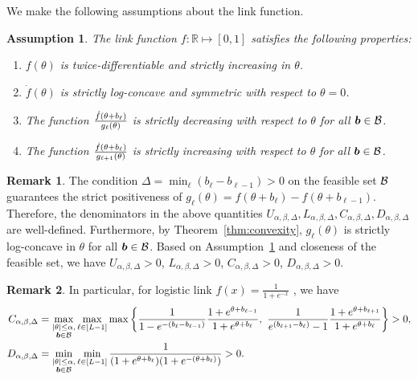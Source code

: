 \documentclass[11pt]{article}
\theoremstyle{plain}
\newtheorem{assumption}{Assumption}
\theoremstyle{definition}
\newtheorem{rmk}{Remark}
\begin{document}
We make the following assumptions about the link function.  
\begin{assumption}\label{ass:joint}
The link function $f\colon \mathbb{R}\mapsto [0,1]$ satisfies the following properties:
\begin{enumerate}
\item $f(\theta)$ is twice-differentiable and strictly increasing in $\theta$.
\item $\dot{f}(\theta)$ is strictly log-concave and symmetric with respect to $\theta=0$. 
\item The function ${\dot{f}(\theta+b_\ell)\over g_\ell(\theta)}$ is strictly decreasing with respect to $\theta$ for all $\bm{b}\in\mathcal{B}$. 
\item The function ${\dot{f}(\theta+b_\ell)\over g_{\ell+1}(\theta)}$ is strictly increasing with respect to $\theta$ for all $\bm{b}\in\mathcal{B}$. 
\end{enumerate}
\end{assumption}

\begin{rmk}
The condition $\Delta=\min_{\ell}(b_{\ell}-b_{\ell-1})>0$ on the feasible set $\mathcal{B}$ guarantees the strict positiveness of $g_{\ell}(\theta)=f(\theta+b_{\ell})-f(\theta+b_{\ell-1})$. Therefore, the denominators in the above quantities $U_{\alpha,\beta,\Delta}, L_{\alpha,\beta,\Delta}, C_{\alpha,\beta,\Delta}, D_{\alpha,\beta,\Delta}$ are well-defined. Furthermore, by Theorem~\ref{thm:convexity}, $g_\ell(\theta)$ is strictly log-concave in $\theta$ for all $\bm{b}\in\mathcal{B}$. Based on Assumption~\ref{ass:joint} and closeness of the feasible set, we have $U_{\alpha,\beta,\Delta}>0$, $L_{\alpha,\beta,\Delta}>0$, $C_{\alpha,\beta,\Delta}>0$, $D_{\alpha,\beta,\Delta}>0$.
\end{rmk}
\begin{rmk}
In particular, for logistic link $f(x) = \frac{1}{1+e^{-x}}$ , we have 
\begin{align}
C_{\alpha,\beta,\Delta}&=\max_{\substack{|\theta|\leq \alpha,\\ \bm{b}\in\mathcal{B}}}\max_{\ell\in[L-1]}\max
\left\{
{ 1\over 1-e^{-(b_{\ell}-b_{\ell-1})}} { 1+e^{\theta+b_{\ell-1}} \over 1+e^{\theta+b_{\ell}}},\
{ 1\over e^{(b_{\ell+1}-b_{\ell})}-1} { 1+e^{\theta+b_{\ell+1}} \over 1+e^{\theta+b_{\ell}}}
\right\}>0,
\\
D_{\alpha,\beta,\Delta}&=\min_{\substack{|\theta|\leq \alpha,\\ \bm{b}\in\mathcal{B}}}\min_{\ell\in[L-1]} {1\over (1+e^{\theta+b_\ell})(1+e^{-(\theta+b_\ell)})}>0.
\end{align}
\end{rmk}
\end{document}
